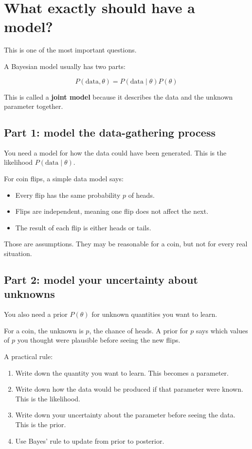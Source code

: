\documentclass[11pt]{article}
\newcommand{\data}{\text{data}}
\begin{document}
\section{What exactly should have a model?}

This is one of the most important questions.

A Bayesian model usually has two parts:

\begin{equation}
\boxed{\displaystyle
P(\data, \theta)=P(\data\mid\theta)P(\theta)
}
\end{equation}

This is called a \textbf{joint model} because it describes the data and the unknown parameter together.

\subsection*{Part 1: model the data-gathering process}

You need a model for how the data could have been generated. This is the likelihood $P(\data\mid\theta)$.

For coin flips, a simple data model says:

\begin{itemize}[leftmargin=1.5em]
  \item Every flip has the same probability $p$ of heads.
  \item Flips are independent, meaning one flip does not affect the next.
  \item The result of each flip is either heads or tails.
\end{itemize}

Those are assumptions. They may be reasonable for a coin, but not for every real situation.

\subsection*{Part 2: model your uncertainty about unknowns}

You also need a prior $P(\theta)$ for unknown quantities you want to learn.

For a coin, the unknown is $p$, the chance of heads. A prior for $p$ says which values of $p$ you thought were plausible before seeing the new flips.

\begin{recipebox}
A practical rule:
\begin{enumerate}[leftmargin=1.5em]
  \item Write down the quantity you want to learn. This becomes a parameter.
  \item Write down how the data would be produced if that parameter were known. This is the likelihood.
  \item Write down your uncertainty about the parameter before seeing the data. This is the prior.
  \item Use Bayes' rule to update from prior to posterior.
\end{enumerate}
\end{recipebox}
\end{document}
